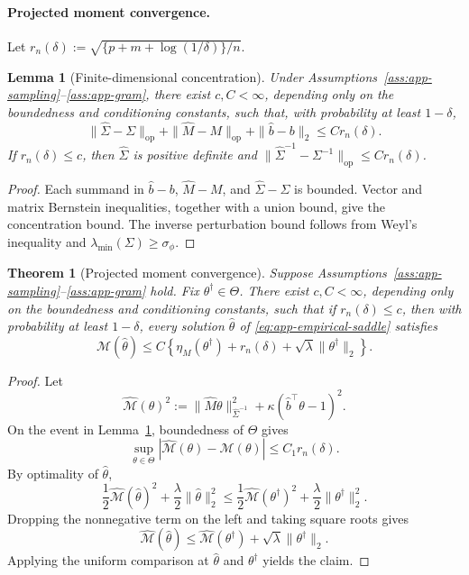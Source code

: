 \documentclass{article}
\theoremstyle{plain}
\newtheorem{theorem}{Theorem}
\newtheorem{lemma}{Lemma}
\theoremstyle{definition}
\theoremstyle{remark}
\begin{document}
\paragraph{Projected moment convergence.}
Let \(r_n(\delta):=\sqrt{\{p+m+\log(1/\delta)\}/n}\).

\begin{lemma}[Finite-dimensional concentration]
\label{lem:app-concentration}
Under Assumptions~\ref{ass:app-sampling}--\ref{ass:app-gram}, there exist
\(c,C<\infty\), depending only on the boundedness and conditioning constants,
such that, with probability at least \(1-\delta\),
\[
\|\widehat\Sigma-\Sigma\|_{\mathrm{op}}
+\|\widehat M-M\|_{\mathrm{op}}
+\|\widehat b-b\|_2
\le
Cr_n(\delta).
\]
If \(r_n(\delta)\le c\), then \(\widehat\Sigma\) is positive definite and
\(\|\widehat\Sigma^{-1}-\Sigma^{-1}\|_{\mathrm{op}}\le Cr_n(\delta)\).
\end{lemma}

\begin{proof}
Each summand in \(\widehat b-b\), \(\widehat M-M\), and
\(\widehat\Sigma-\Sigma\) is bounded. Vector and matrix Bernstein inequalities,
together with a union bound, give the concentration bound. The inverse
perturbation bound follows from Weyl's inequality and
\(\lambda_{\min}(\Sigma)\ge\sigma_\phi\).
\end{proof}

\begin{theorem}[Projected moment convergence]
\label{thm:app-projected-moment}
Suppose Assumptions~\ref{ass:app-sampling}--\ref{ass:app-gram} hold. Fix
\(\theta^\dagger\in\Theta\). There exist \(c,C<\infty\), depending only on the
boundedness and conditioning constants, such that if \(r_n(\delta)\le c\), then
with probability at least \(1-\delta\), every solution \(\widehat\theta\) of
\eqref{eq:app-empirical-saddle} satisfies
\[
\mathcal M(\widehat\theta)
\le
C\left\{
\eta_M(\theta^\dagger)
+r_n(\delta)
+\sqrt{\lambda}\|\theta^\dagger\|_2
\right\}.
\]
\end{theorem}

\begin{proof}
Let
\[
\widehat{\mathcal M}(\theta)^2
:=
\|\widehat M\theta\|_{\widehat\Sigma^{-1}}^2
+\kappa(\widehat b^\top\theta-1)^2 .
\]
On the event in Lemma~\ref{lem:app-concentration}, boundedness of \(\Theta\)
gives
\[
\sup_{\theta\in\Theta}
|\widehat{\mathcal M}(\theta)-\mathcal M(\theta)|
\le C_1r_n(\delta).
\]
By optimality of \(\widehat\theta\),
\[
\frac12\widehat{\mathcal M}(\widehat\theta)^2
+\frac{\lambda}{2}\|\widehat\theta\|_2^2
\le
\frac12\widehat{\mathcal M}(\theta^\dagger)^2
+\frac{\lambda}{2}\|\theta^\dagger\|_2^2 .
\]
Dropping the nonnegative term on the left and taking square roots gives
\[
\widehat{\mathcal M}(\widehat\theta)
\le
\widehat{\mathcal M}(\theta^\dagger)
+\sqrt{\lambda}\|\theta^\dagger\|_2 .
\]
Applying the uniform comparison at \(\widehat\theta\) and \(\theta^\dagger\)
yields the claim.
\end{proof}
\end{document}
